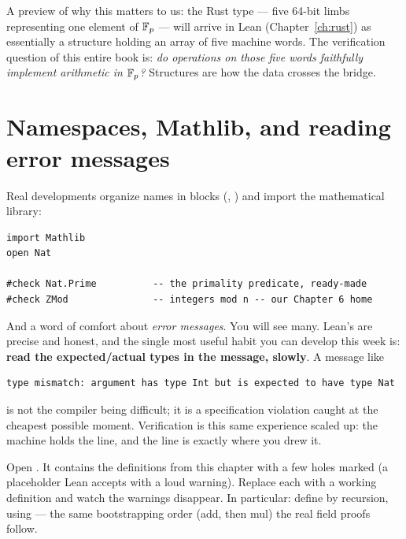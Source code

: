 A preview of why this matters to us: the Rust type
 --- five 64-bit limbs representing
one element of $\mathbb{F}_p$ --- will arrive in Lean (Chapter~\ref{ch:rust}) as
essentially a structure holding an array of five machine words. The
verification question of this entire book is: \emph{do operations on those
five words faithfully implement arithmetic in $\mathbb{F}_p$?} Structures are how the
data crosses the bridge.

\section{Namespaces, Mathlib, and reading error messages}

Real developments organize names in  blocks
(, ) and import the mathematical library:

\begin{lstlisting}[language=Lean]
import Mathlib
open Nat

#check Nat.Prime          -- the primality predicate, ready-made
#check ZMod               -- integers mod n -- our Chapter 6 home
\end{lstlisting}

And a word of comfort about \emph{error messages}. You will see many. Lean's
are precise and honest, and the single most useful habit you can develop this
week is: \textbf{read the expected/actual types in the message, slowly}. A
message like

\begin{lstlisting}
type mismatch: argument has type Int but is expected to have type Nat
\end{lstlisting}

is not the compiler being difficult; it is a specification violation caught at
the cheapest possible moment. Verification is this same experience scaled up:
the machine holds the line, and the line is exactly where you drew it.

\begin{tryit}
Open . It contains the definitions from this chapter
with a few holes marked  (a placeholder Lean accepts with a loud
warning). Replace each with a working definition and watch the warnings
disappear. In particular: define  by recursion,
using  --- the same bootstrapping order (add, then mul) the real
field proofs follow.
\end{tryit}

